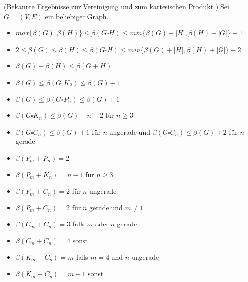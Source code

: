 \begin{lem}(Bekannte Ergebnisse zur Vereinigung und zum kartesischen Produkt \cite{somefamiliesofgraphs})\newline
Sei $G=(V,E)$ ein beliebiger Graph.
\begin{itemize}
\item $max\{\beta(G),\beta(H)\}\leq \beta(G\square H) \leq min\{\beta(G)+|H|,\beta(H)+|G|\}-1$
\item $2 \leq \beta(G) \leq \beta(H) \leq \beta(G\square H) \leq min\{\beta(G)+|H|,\beta(H)+|G|\}-2$
\item $\beta(G)+\beta(H) \leq \beta(G+H)$
\item $\beta(G)\leq \beta(G\square K_2) \leq \beta(G)+1$
\item $\beta(G)\leq \beta(G\square P_n) \leq \beta(G)+1$
\item $\beta(G\square K_n) \leq \beta(G)+n-2$ für $n \geq 3$
\item $\beta(G\square C_n) \leq \beta(G)+1$ für $n$ ungerade und $\beta(G\square C_n) \leq \beta(G)+2$ für $n$ gerade
\item $\beta(P_m+P_n)=2$
\item $\beta(P_m+K_n)=n-1$ für $n\geq 3$
\item $\beta(P_m+C_n)=2$ für $n$ ungerade
\item $\beta(P_m+C_n)=2$ für $n$ gerade und $m \neq 1$
\item $\beta(C_m+C_n)=3$ falls $m$ oder $n$ gerade
\item $\beta(C_m+C_n)=4$ sonst
\item $\beta(K_m+C_n)=m$ falls $m=4$ und $n$ ungerade
\item $\beta(K_m+C_n)=m-1$ sonst
\end{itemize}
\end{lem}
